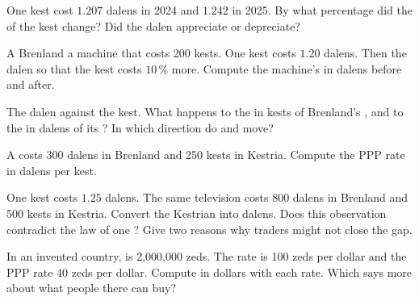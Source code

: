 \begin{exercise}[$\star\star$]\label{exo:g9:exchange-rates-and-purchasing-power:5}
One kest cost $1.207$ dalens in 2024 and $1.242$ in 2025. By what percentage did the  of the kest
change? Did the dalen appreciate or depreciate?
\end{exercise}

\begin{exercise}[$\star\star$]\label{exo:g9:exchange-rates-and-purchasing-power:6}
A Brenland   a machine that costs 200 kests. One kest costs $1.20$ dalens. Then the dalen
 so that the kest costs $10\,\%$ more. Compute the machine's  in dalens before and after.
\end{exercise}

\begin{exercise}[$\star\star$]\label{exo:g9:exchange-rates-and-purchasing-power:7}
The dalen  against the kest. What happens to the  in kests of Brenland's , and to the
 in dalens of its ? In which direction do  and  move?
\end{exercise}

\begin{exercise}[$\star\star$]\label{exo:g9:exchange-rates-and-purchasing-power:8}
A  costs 300 dalens in Brenland and 250 kests in Kestria. Compute the PPP rate in dalens per kest.
\end{exercise}

\begin{exercise}[$\star\star$]\label{exo:g9:exchange-rates-and-purchasing-power:9}
One kest costs $1.25$ dalens. The same television costs 800 dalens in Brenland and 500 kests in Kestria.
Convert the Kestrian  into dalens. Does this observation contradict the law of one ? Give two
reasons why traders might not close the gap.
\end{exercise}

\begin{exercise}[$\star\star\star$]\label{exo:g9:exchange-rates-and-purchasing-power:10}
In an invented country,  is 2,000,000 zeds. The  rate is 100 zeds per dollar and the
PPP rate 40 zeds per dollar. Compute  in dollars with each rate. Which says more about what
people there can buy?
\end{exercise}

